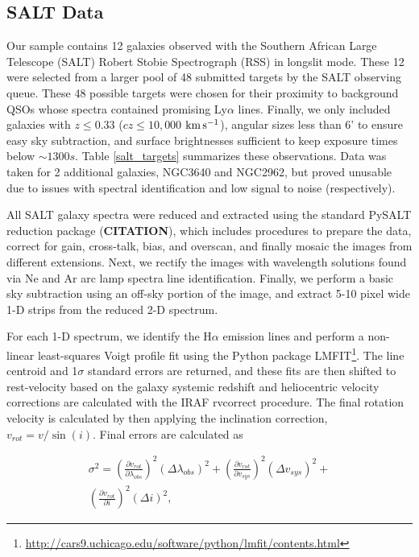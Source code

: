 \documentclass[iop]{emulateapj-rtx4}
\newcommand{\kms}{$\rm km\, s^{-1}$}
\begin{document}
\subsection{SALT Data}
Our sample contains 12 galaxies observed with the Southern African Large Telescope (SALT) Robert Stobie Spectrograph (RSS) in longslit mode. These 12 were selected from a larger pool of 48 submitted targets by the SALT observing queue. These 48 possible targets were chosen for their proximity to background QSOs whose spectra contained promising Ly$\alpha$ lines. Finally, we only included galaxies with $z \leq 0.33$ ($cz \leq 10,000$ \kms), angular sizes less than 6' to ensure easy sky subtraction, and surface brightnesses sufficient to keep exposure times below $\sim 1300 s$. Table \ref{salt_targets} summarizes these observations. Data was taken for 2 additional galaxies, NGC3640 and NGC2962, but proved unusable due to issues with spectral identification and low signal to noise (respectively).



All SALT galaxy spectra were reduced and extracted using the standard PySALT reduction package (\textbf{CITATION}), which includes procedures to prepare the data, correct for gain, cross-talk, bias, and overscan, and finally mosaic the images from different extensions. Next, we rectify the images with wavelength solutions found via Ne and Ar arc lamp spectra line identification. Finally, we perform a basic sky subtraction using an off-sky portion of the image, and extract 5-10 pixel wide 1-D strips from the reduced 2-D spectrum. 

For each 1-D spectrum, we identify the H$\alpha$ emission lines and perform a non-linear least-squares Voigt profile fit using the Python package LMFIT\footnote{\url{http://cars9.uchicago.edu/software/python/lmfit/contents.html}}. The line centroid and 1$\sigma$ standard errors are returned, and these fits are then shifted to rest-velocity based on the galaxy systemic redshift and heliocentric velocity corrections are calculated with the IRAF rvcorrect procedure. The final rotation velocity is calculated by then applying the inclination correction, $v_{rot} = v / \sin(i)$. Final errors are calculated as

\begin{equation}
\begin{split}
	\sigma^2 = \left( \frac{\partial v_{rot}}{\partial \lambda_{obs}} \right)^2 (\Delta \lambda_{obs})^2 + \left(\frac{\partial v_{rot}}{\partial v_{sys}} \right)^2 (\Delta v_{sys})^2 + \\
	\left( \frac{\partial v_{rot}}{\partial i} \right)^2 (\Delta i)^2,
\end{split}
\end{equation}
\end{document}
